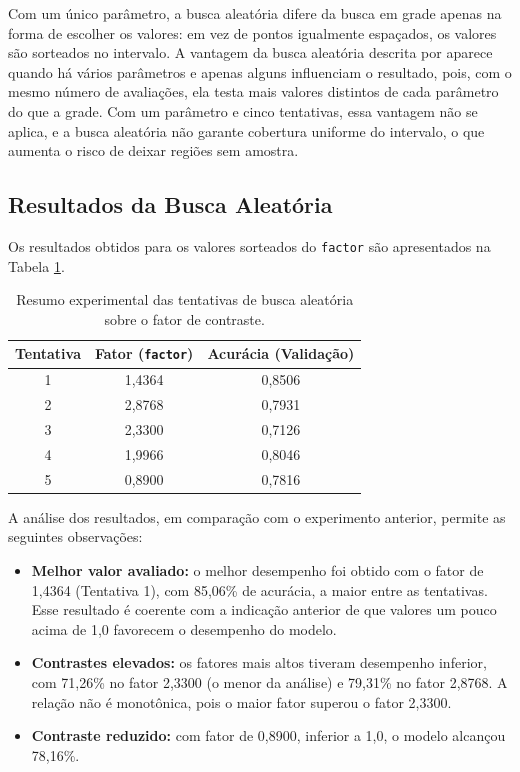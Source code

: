 Com um único parâmetro, a busca aleatória difere da busca em grade apenas na forma de escolher os valores: em vez de pontos igualmente espaçados, os valores são sorteados no intervalo. A vantagem da busca aleatória descrita por  aparece quando há vários parâmetros e apenas alguns influenciam o resultado, pois, com o mesmo número de avaliações, ela testa mais valores distintos de cada parâmetro do que a grade. Com um parâmetro e cinco tentativas, essa vantagem não se aplica, e a busca aleatória não garante cobertura uniforme do intervalo, o que aumenta o risco de deixar regiões sem amostra.

\subsection{Resultados da Busca Aleatória}

Os resultados obtidos para os valores sorteados do \texttt{factor} são apresentados na Tabela \ref{tab:resultados_random_search}.

\begin{table}[H]
    \centering
    \caption{\label{tab:resultados_random_search}Resumo experimental das tentativas de busca aleatória sobre o fator de contraste.}
    \vspace{0.2cm}
    \begin{tabular}{ccc}
        \hline
        \textbf{Tentativa} & \textbf{Fator (\texttt{factor})} & \textbf{Acurácia (Validação)} \\
        \hline
        1 & 1,4364 & 0,8506 \\
        2 & 2,8768 & 0,7931 \\
        3 & 2,3300 & 0,7126 \\
        4 & 1,9966 & 0,8046 \\
        5 & 0,8900 & 0,7816 \\
        \hline
    \end{tabular}
\end{table}

\indent A análise dos resultados, em comparação com o experimento anterior, permite as seguintes observações:
\begin{itemize}
    \item \textbf{Melhor valor avaliado:} o melhor desempenho foi obtido com o fator de 1,4364 (Tentativa 1), com 85,06\% de acurácia, a maior entre as tentativas. Esse resultado é coerente com a indicação anterior de que valores um pouco acima de 1,0 favorecem o desempenho do modelo.
    \item \textbf{Contrastes elevados:} os fatores mais altos tiveram desempenho inferior, com 71,26\% no fator 2,3300 (o menor da análise) e 79,31\% no fator 2,8768. A relação não é monotônica, pois o maior fator superou o fator 2,3300.
    \item \textbf{Contraste reduzido:} com fator de 0,8900, inferior a 1,0, o modelo alcançou 78,16\%.
\end{itemize}

